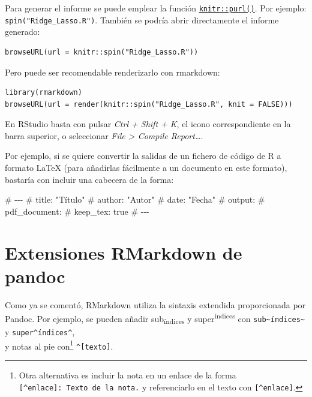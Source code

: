 \documentclass[
]{book}
\newenvironment{Shaded}{\begin{snugshade}}{\end{snugshade}}
\newcommand{\NormalTok}[1]{#1}
\theoremstyle{break}
\theoremstyle{nonumberplain}
\let\oldfootnote\footnote
\renewcommand\footnote[1]{\oldfootnote{\hspace{2mm}#1}}
\begin{document}
Para generar el informe se puede emplear la función \href{https://rdrr.io/pkg/knitr/man/knit.html}{\texttt{knitr::purl()}}.
Por ejemplo: \texttt{spin("Ridge\_Lasso.R")}.
También se podría abrir directamente el informe generado:

\begin{verbatim}
browseURL(url = knitr::spin("Ridge_Lasso.R"))
\end{verbatim}

Pero puede ser recomendable renderizarlo con rmarkdown:

\begin{verbatim}
library(rmarkdown)
browseURL(url = render(knitr::spin("Ridge_Lasso.R", knit = FALSE)))
\end{verbatim}

En RStudio basta con pulsar \emph{Ctrl + Shift + K}, el icono correspondiente en la barra superior, o seleccionar \emph{File \textgreater{} Compile Report\ldots{}}.

Por ejemplo, si se quiere convertir la salidas de un fichero de código de R a formato LaTeX
(para añadirlas fácilmente a un documento en este formato), bastaría con incluir una cabecera de
la forma:

\begin{Shaded}
\begin{Highlighting}[]
\NormalTok{\#\textquotesingle{} {-}{-}{-}}
\NormalTok{\#\textquotesingle{} title: "Título"}
\NormalTok{\#\textquotesingle{} author: "Autor"}
\NormalTok{\#\textquotesingle{} date: "Fecha"}
\NormalTok{\#\textquotesingle{} output:}
\NormalTok{\#\textquotesingle{}   pdf\_document:}
\NormalTok{\#\textquotesingle{}      keep\_tex: true}
\NormalTok{\#\textquotesingle{} {-}{-}{-}}
\end{Highlighting}
\end{Shaded}

\section{Extensiones RMarkdown de pandoc}\label{extensiones-rmarkdown-de-pandoc}

Como ya se comentó, RMarkdown utiliza la sintaxis extendida proporcionada por Pandoc.
Por ejemplo, se pueden añadir sub\textsubscript{índices} y super\textsuperscript{índices} con \texttt{sub\textasciitilde{}índices\textasciitilde{}} y \texttt{super\^{}índices\^{}},\\
y notas al pie con\footnote{Otra alternativa es incluir la nota en un enlace de la forma \texttt{{[}\^{}enlace{]}:\ Texto\ de\ la\ nota.} y referenciarlo en el texto con \texttt{{[}\^{}enlace{]}}.} \texttt{\^{}{[}texto{]}}.
\end{document}
